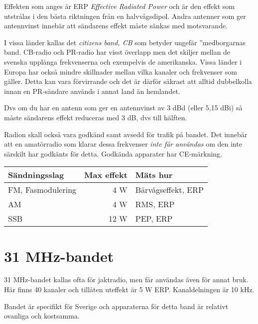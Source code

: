 Effekten som anges är ERP \textit{Effective Radiated Power} och är den effekt som utstrålas i den bästa riktningen från en halvvågsdipol. Andra antenner som ger antennvinst innebär att sändarens effekt måste sänkas med motsvarande.

I vissa länder kallas det \textit{citizens band, CB} som betyder ungefär ''medborgarnas band. CB-radio och PR-radio har visst överlapp men det skiljer mellan de svenska upplånga frekvenserna och exempelvis de amerikanska. Vissa länder i Europa har också mindre skillnader mellan vilka kanaler och frekvenser som gäller. Detta kan vara förvirrande och det är därför säkrast att alltid dubbelkolla innan en PR-sändare används i annat land än hemlandet. 


Dvs om du har en antenn som ger en antennvinst av 3 dBd (eller 5,15 dBi) så måste sändarens effekt reduceras med 3 dB, dvs till hälften.

Radion skall också vara godkänd samt avsedd för trafik på bandet. Det innebär att en amatörradio som klarar dessa frekvenser \textit{inte får användas} om den inte särskilt har godkänts för detta. Godkända apparater har CE-märkning.

\begin{table}[h]
\begin{tabular}{lrl}
	Sändningsslag     & Max effekt & Mäts hur           \\ \hline
	FM, Fasmodulering &        4 W & Bärvågseffekt, ERP \\
	AM                &        4 W & RMS, ERP           \\
	SSB               &       12 W & PEP, ERP
\end{tabular}
\end{table}

\section{31 MHz-bandet}

31 MHz-bandet kallas ofta för jaktradio, men får användas även för annat bruk.
Här finns 40 kanaler och tillåten uteffekt är 5 W ERP. Kanaldelningen är 10 kHz.

Bandet är specifikt för Sverige och apparaterna för detta band är relativt ovanliga och kostsamma.

